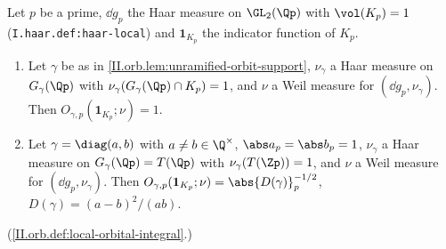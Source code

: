 Let $p$ be a prime, $\dd g_p$ the Haar measure on $\GL_2(\Qp)$ with $\vol(K_p)=1$ (\texttt{I.haar.def:haar-local}) and $\mathbf 1_{K_p}$ the indicator function of $K_p$.
\begin{enumerate}
  \item[(a)] Let $\gamma$ be as in \cref{II.orb.lem:unramified-orbit-support}, $\nu_\gamma$ a Haar measure on $G_\gamma(\Qp)$ with $\nu_\gamma(G_\gamma(\Qp)\cap K_p)=1$, and
  $\nu$ a Weil measure for $(\dd g_p,\nu_\gamma)$. Then $O_{\gamma,p}(\mathbf 1_{K_p};\nu)=1$.
  \item[(b)] Let $\gamma=\diag(a,b)$ with $a\neq b\in\Q^\times$, $\abs a_p=\abs b_p=1$, $\nu_\gamma$ a Haar measure on $G_\gamma(\Qp)=T(\Qp)$ with $\nu_\gamma(T(\Zp))=1$, and $\nu$
  a Weil measure for $(\dd g_p,\nu_\gamma)$. Then $O_{\gamma,p}(\mathbf 1_{K_p};\nu)=\abs{D(\gamma)}_p^{-1/2}$, $D(\gamma)=(a-b)^2/(ab)$.
\end{enumerate}
(\cref{II.orb.def:local-orbital-integral}.)
